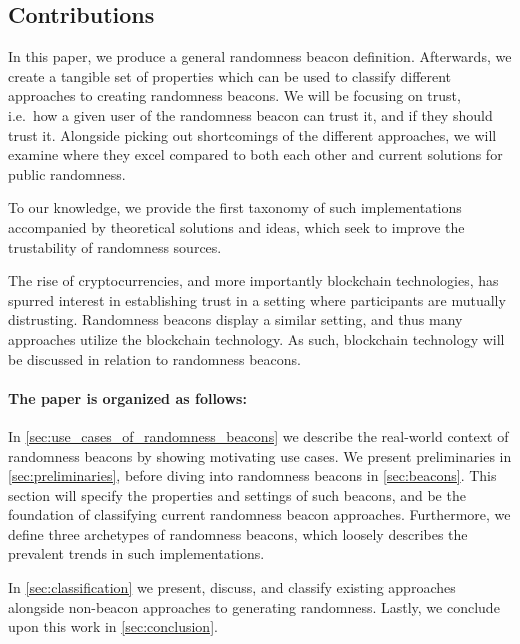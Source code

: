 \subsection*{Contributions}\label{subsec:contributions}
In this paper, we produce a general randomness beacon definition. Afterwards, we create a tangible set of properties which can be used to classify different approaches to creating randomness beacons.
We will be focusing on trust, i.e.\ how a given user of the randomness beacon can trust it, and if they should trust it.
Alongside picking out shortcomings of the different approaches, we will examine where they excel compared to both each other and current solutions for public randomness.

To our knowledge, we provide the first taxonomy of such implementations accompanied by theoretical solutions and ideas, which seek to improve the trustability of randomness sources.

The rise of cryptocurrencies, and more importantly blockchain technologies, has spurred interest in establishing trust in a setting where participants are mutually distrusting.
Randomness beacons display a similar setting, and thus many approaches utilize the blockchain technology.
As such, blockchain technology will be discussed in relation to randomness beacons.

\paragraph{The paper is organized as follows:}
In \cref{sec:use_cases_of_randomness_beacons} we describe the real-world context of randomness beacons by showing motivating use cases.
We present preliminaries in \cref{sec:preliminaries}, before diving into randomness beacons in \cref{sec:beacons}.
This section will specify the properties and settings of such beacons, and be the foundation of classifying current randomness beacon approaches.
Furthermore, we define three archetypes of randomness beacons, which loosely describes the prevalent trends in such implementations.

In \cref{sec:classification} we present, discuss, and classify existing approaches alongside non-beacon approaches to generating randomness.
Lastly, we conclude upon this work in \cref{sec:conclusion}.

